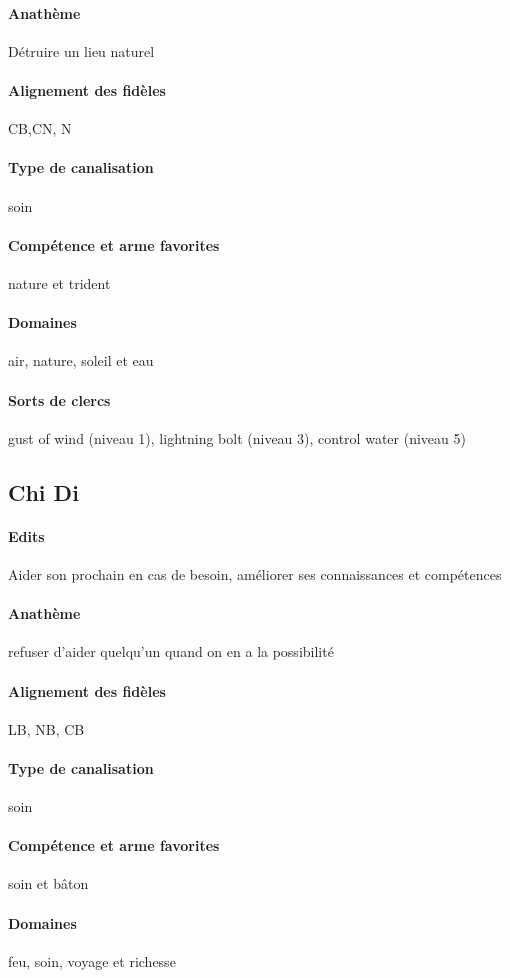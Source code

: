\documentclass[10pt,a4paper]{book}
\begin{document}
\paragraph{Anathème}Détruire un lieu naturel
\paragraph{Alignement des fidèles}CB,CN, N
\paragraph{Type de canalisation}soin
\paragraph{Compétence et arme favorites}nature et trident
\paragraph{Domaines}air, nature, soleil et eau
\paragraph{Sorts de clercs}gust of wind (niveau 1), lightning bolt (niveau 3), control water (niveau 5)
\subsection{Chi Di}
\paragraph{Edits}Aider son prochain en cas de besoin, améliorer ses connaissances et compétences
\paragraph{Anathème}refuser d'aider quelqu'un quand on en a la possibilité
\paragraph{Alignement des fidèles}LB, NB, CB
\paragraph{Type de canalisation}soin
\paragraph{Compétence et arme favorites}soin et bâton
\paragraph{Domaines}feu, soin, voyage et richesse
\end{document}
